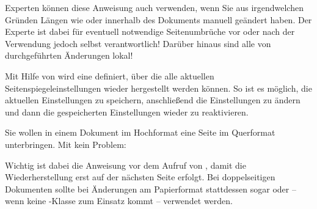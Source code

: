 Experten können diese Anweisung auch verwenden, wenn Sie aus irgendwelchen
Gründen Längen wie  oder  innerhalb des
Dokuments manuell geändert haben. Der Experte ist dabei für eventuell
notwendige Seitenumbrüche vor oder nach der Verwendung jedoch selbst
verantwortlich! Darüber hinaus sind alle von 
durchgeführten Änderungen lokal!%
% 
\EndIndexGroup


\begin{Declaration}
\end{Declaration}
Mit Hilfe von  wird eine  definiert, über
die alle aktuellen Seitenspiegeleinstellungen wieder hergestellt werden
können. So ist es möglich, die aktuellen Einstellungen zu speichern,
anschließend die Einstellungen zu ändern und dann die gespeicherten
Einstellungen wieder zu reaktivieren.

\begin{Example}
  Sie wollen in einem Dokument im Hochformat eine Seite im Querformat
  unterbringen. Mit  kein Problem:
  Wichtig ist dabei die Anweisung
   vor dem Aufruf von
  , damit die Wiederherstellung erst auf der
  nächsten Seite erfolgt. Bei doppelseitigen Dokumenten sollte bei Änderungen
  am Papierformat stattdessen sogar
   oder
  -- wenn keine \KOMAScript-Klasse zum Einsatz kommt --
   verwendet
  werden.%
\end{Example}

